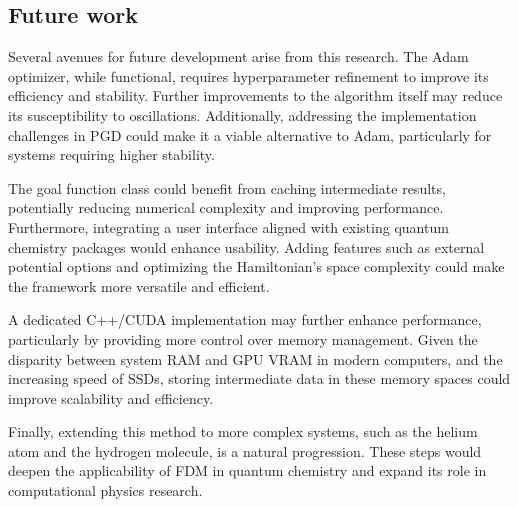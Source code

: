 \subsection{Future work}

%
%
%
%
%
%
%
%
%
Several avenues for future development arise from this research. The Adam optimizer, while functional, requires hyperparameter refinement to improve its efficiency and stability. Further improvements to the algorithm itself may reduce its susceptibility to oscillations. Additionally, addressing the implementation challenges in PGD could make it a viable alternative to Adam, particularly for systems requiring higher stability.

The goal function class could benefit from caching intermediate results, potentially reducing numerical complexity and improving performance. Furthermore, integrating a user interface aligned with existing quantum chemistry packages would enhance usability. Adding features such as external potential options and optimizing the Hamiltonian's space complexity could make the framework more versatile and efficient.

A dedicated C++/CUDA implementation may further enhance performance, particularly by providing more control over memory management. Given the disparity between system RAM and GPU VRAM in modern computers, and the increasing speed of SSDs, storing intermediate data in these memory spaces could improve scalability and efficiency.

Finally, extending this method to more complex systems, such as the helium atom and the hydrogen molecule, is a natural progression. These steps would deepen the applicability of FDM in quantum chemistry and expand its role in computational physics research.